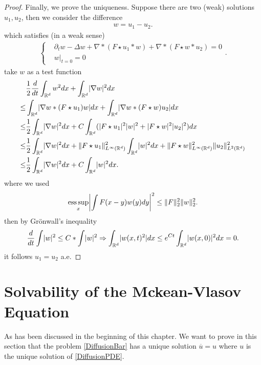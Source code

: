 \begin{proof}
   \vskip5mm
   Finally, we prove the uniqueness. Suppose there are two (weak) solutions $u_{1},u_{2}$, then we consider the difference 
 \begin{align*}
  w = u_{1} - u_{2}
 .\end{align*}
 which satisfies  (in a weak sense)
 \begin{align*}
  \begin{cases}
    &\partial_t w - \Delta w + \nabla *(F \star  u_{1} * w) + \nabla*(F \star w * u_{2}) = 0\\
    &w \rvert_{t=0} = 0
  \end{cases}
 .\end{align*}
take $w$ as a test function 
\begin{align*}
&  \frac{1}{2} \frac{d}{dt} \int_{\mathbb{R}^{d} } w^2dx+ \int_{\mathbb{R}^{d} } \abs{\nabla w}^2dx \\
 \le & \int_{\mathbb{R}^{d} } \abs{\nabla w *(F \star  u_{1})w} dx  + \int_{\R^d}  \abs{\nabla w * (F \star  w)u_{2}} dx\\
 \le & \frac{1}{2} \int_{\mathbb{R}^{d} } \abs{\nabla w}^2dx + C\int_{\mathbb{R}^{d} } (\abs{F \star  u_{1}}^2 \abs{w}^2 + \abs{F \star  w}^2 \abs{u_{2}}^2)dx\\
   \le & \frac{1}{2} \int_{\mathbb{R}^{d} } \abs{\nabla w}^2dx+ \|F\star  u_{1}\|_{L^{\infty}(\R^d)}^2 \int_{\mathbb{R}^{d} }  \abs{w}^2dx + \|F \star  w\|_{L^\infty(\R^d)}^2 \|u_2\|_{L^{2}(\R^d) }^2\\
        \le & \frac{1}{2} \int_{\mathbb{R}^{d} } \abs{\nabla w}^2dx+ C \int_{\R^d}\abs{w}^2 dx%
.\end{align*}
where we used
\begin{align*}
  \essup_{x} \abs*{\int  F(x-y)w(y) dy}^2 \le \|F\|_2^{2}\|w\|_2^{2}  
.\end{align*}
then by Grönwall's inequality
\begin{align*}
  \frac{d}{dt} \int \lvert w\rvert^2 \le C*\int \lvert w\rvert^2 \Rightarrow \int_{\mathbb{R}^{d} }\lvert w(x,t)^2\rvert dx \le  e^{Ct} \int_{\mathbb{R}^{d} } \lvert w(x,0)\rvert^2 dx = 0
.\end{align*}
it follows $u_{1}=u_{2}$ a.e.
\end{proof}

\section{Solvability of the Mckean-Vlasov Equation}
As has been discussed in the beginning of this chapter. We want to prove in this section that the problem \autoref{DiffusionBar} has a unique solution $\overline{u}=u$ where $u$ is the unique solution of \autoref{DiffusionPDE}.

